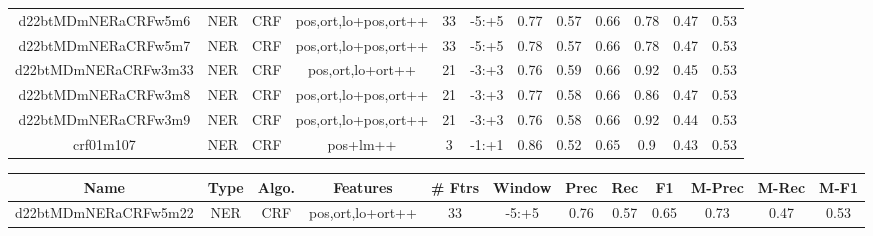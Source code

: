 \documentclass[a4paper]{article}
\begin{document}
\begin{landscape}
\begin{center}
\begin{tabular}{ |c|c|c|c|c|c|c|c|c|c|c|c|}
 	
 
 	
 		
 		\small{ d22btMDmNERaCRFw5m6 } & NER & CRF & pos,ort,lo+pos,ort++  &  33 &  -5:+5  &  0.77 & 0.57 & 0.66  &  0.78 & 0.47 & 0.53 \\
 		

 	
 
 	
 		
 		\small{ d22btMDmNERaCRFw5m7 } & NER & CRF & pos,ort,lo+pos,ort++  &  33 &  -5:+5  &  0.78 & 0.57 & 0.66  &  0.78 & 0.47 & 0.53 \\
 		

 	
 
 	
 		
 		\small{ d22btMDmNERaCRFw3m33 } & NER & CRF & pos,ort,lo+ort++  &  21 &  -3:+3  &  0.76 & 0.59 & 0.66  &  0.92 & 0.45 & 0.53 \\
 		

 	
 
 	
 		
 		\small{ d22btMDmNERaCRFw3m8 } & NER & CRF & pos,ort,lo+pos,ort++  &  21 &  -3:+3  &  0.77 & 0.58 & 0.66  &  0.86 & 0.47 & 0.53 \\
 		

 	
 
 	
 		
 		\small{ d22btMDmNERaCRFw3m9 } & NER & CRF & pos,ort,lo+pos,ort++  &  21 &  -3:+3  &  0.76 & 0.58 & 0.66  &  0.92 & 0.44 & 0.53 \\
 		

 	
 
 	
 		
 		\small{ crf01m107 } & NER & CRF & pos+lm++  &  3 &  -1:+1  &  0.86 & 0.52 & 0.65  &  0.9 & 0.43 & 0.53 \\
 		
 \hline
\end{tabular}
\end{center}




\begin{center}
\begin{tabular}{ |c|c|c|c|c|c|c|c|c|c|c|c|} 
 \hline
 	Name & Type & Algo. & Features & \# Ftrs & Window & Prec & Rec & F1 & M-Prec & M-Rec & M-F1\\
 \hline

 		

 	
 
 	
 		
 		\small{ d22btMDmNERaCRFw5m22 } & NER & CRF & pos,ort,lo+ort++  &  33 &  -5:+5  &  0.76 & 0.57 & 0.65  &  0.73 & 0.47 & 0.53 \\
 		


\end{tabular}
\end{center}
\end{landscape}
\end{document}

